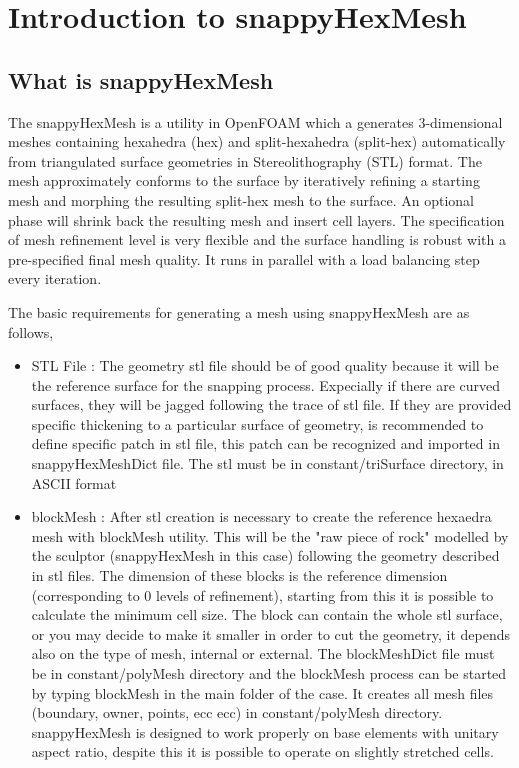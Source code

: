 \chapter{Introduction to snappyHexMesh}
\thispagestyle{empty}
\label{sec:chap13}
\newcommand{\LocCHonethreefig}{\Origin/CHAPTERS/chap13/figures}

\section{What is snappyHexMesh}

The snappyHexMesh is a utility in OpenFOAM which a generates 3-dimensional meshes containing hexahedra (hex) and split-hexahedra (split-hex) automatically from triangulated surface geometries in Stereolithography (STL) format. The mesh approximately conforms to the surface by iteratively refining a starting mesh and morphing the resulting split-hex mesh to the surface. An optional phase will shrink back the resulting mesh and insert cell layers. The specification of mesh refinement level is very flexible and the surface handling is robust with a pre-specified final mesh quality. It runs in parallel with a load balancing step every iteration.\newline

\flushleft The basic requirements for generating a mesh using snappyHexMesh are as follows,

\begin{itemize}
\item STL File : The geometry stl file should be of good quality because it will be the reference surface for the snapping process. Expecially if there are curved surfaces, they will be jagged following the trace of stl file. If they are provided specific thickening to a particular surface of geometry, is recommended to define specific patch in stl file, this patch can be recognized and imported in snappyHexMeshDict file. The stl must be in constant/triSurface directory, in ASCII format
\item blockMesh : After stl creation is necessary to create the reference hexaedra mesh with blockMesh utility. This will be the "raw piece of rock" modelled by the sculptor (snappyHexMesh in this case) following the geometry described in stl files. The dimension of these blocks is the reference dimension (corresponding to 0 levels of refinement), starting from this it is possible to calculate the minimum cell size. The block can contain the whole stl surface, or you may decide to make it smaller in order to cut the geometry, it depends also on the type of mesh, internal or external.
The blockMeshDict file must be in constant/polyMesh directory and the blockMesh process can be started by typing blockMesh in the main folder of the case. It creates all mesh files (boundary, owner, points, ecc ecc) in constant/polyMesh directory.
snappyHexMesh is designed to work properly on base elements with unitary aspect ratio, despite this it is possible to operate on slightly stretched cells.

\end{itemize} 


